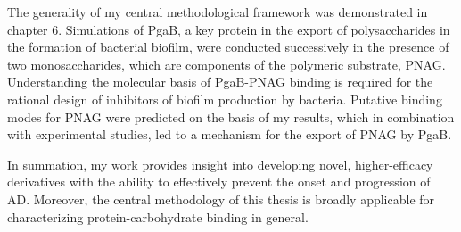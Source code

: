 The generality of my central methodological framework was demonstrated in chapter 6. Simulations of PgaB, a key protein in the export of polysaccharides in the formation of bacterial biofilm, were conducted successively in the presence of two monosaccharides, which are components of the polymeric substrate, PNAG. Understanding the molecular basis of PgaB-PNAG binding is required for the rational design of inhibitors of biofilm production by bacteria. Putative binding modes for PNAG were predicted on the basis of my results, which in combination with experimental studies, led to a mechanism for the export of PNAG by PgaB.

In summation, my work provides insight into developing novel, higher-efficacy derivatives with the ability to effectively prevent the onset and progression of AD.  Moreover, the central methodology of this thesis is broadly applicable for characterizing protein-carbohydrate binding in general.




